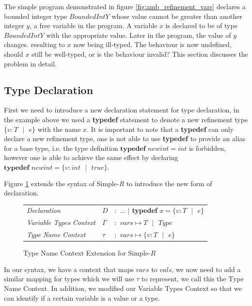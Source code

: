 \documentclass[a4paper,12pt]{report}
\begin{document}
\par
The simple program demonstrated in figure \ref{fig:amb_refinement_vars} declares a 
bounded integer type $BoundedIntY$ whose value cannot be greater than another integer $y$, 
a free variable in the program. A variable $x$ is declared to be of type 
$BoundedIntY$ with the appropriate value. Later in the program, the value of $y$ 
changes. resulting to $x$ now being ill-typed. The behaviour is now undefined, 
should $x$ still be well-typed, or is the behaviour invalid? This section 
discusses the problem in detail. 

\subsection{Type Declaration}
First we need to introduce a new declaration statement for type declaration, 
in the example above we used a \textbf{typedef} statement to denote a 
new refinement type $\{\upsilon : T\text{ }|\text{ }e\}$ with the name $x$. It is 
important to note that a \textbf{typedef} can only declare a new refinement type, one is 
not able to use \textbf{typedef} to provide an alias for a base type, i.e. the type 
definition $\textbf{typedef } newint = int$ is forbidden, however one is able to achieve the 
same effect by declaring $\textbf{typedef }newint = \{\upsilon : int\text{ }|\text{ }true\}$.

\par
Figure \ref{fig:typedef-extend} extends the syntax of Simple-$R$ to introduce 
the new form of declaration.
\begin{figure}[H]
  \begin{center}
    \begin{tabular} {l l l}
      \textit{Declaration} & $D$ & $:$ ... $|$ \textbf{typedef }$x = \{\upsilon : T\text{ }|\text{ }e\}$\\
      \textit{Variable Types Context} & $\Gamma$& $:$ $vars \mapsto T\text{ }|\text{ }Type$\\
      \textit{Type Name Context} & $\tau$& $:$ $vars \mapsto \{\upsilon : T\text{ }|\text{ }e\}$ \\
    \end{tabular}
  \end{center}
  \caption{Type Name Context Extension for Simple-$R$}
  \label{fig:typedef-extend}
\end{figure}

\par
In our syntax, we have a context that maps $vars$ to $vals$, we now need to 
add a similar mapping for types which we will use $\tau$ to represent, we call this 
the Type Name Context. In addition, we modified our Variable Types Context 
so that we can identify if a certain variable is a value or a type. 
\end{document}
